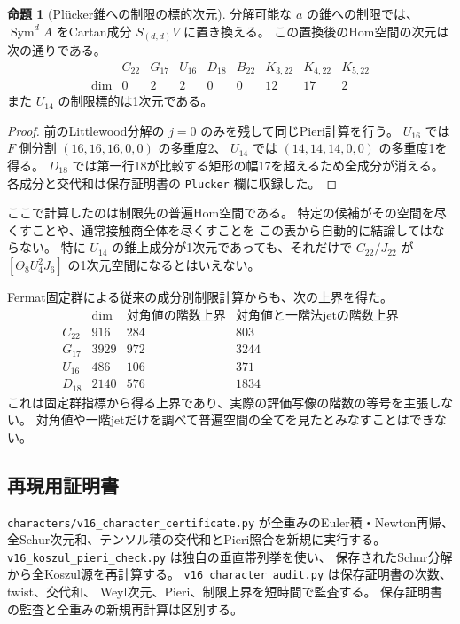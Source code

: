 \documentclass[a4paper,11pt]{ltjsarticle}
\theoremstyle{definition}
\newtheorem{proposition}[theorem]{命題}
\begin{document}
\begin{proposition}[Pl\"ucker錐への制限の標的次元]
\label{prop:v16-plucker-dimensions}
分解可能な $a$ の錐への制限では、$\operatorname{Sym}^dA$ をCartan成分
$S_{(d,d)}V$ に置き換える。
この置換後のHom空間の次元は次の通りである。
\[
\begin{array}{c|rrrrrrrr}
 &C_{22}&G_{17}&U_{16}&D_{18}&B_{22}&K_{3,22}&K_{4,22}&K_{5,22}\\\hline
 \dim&0&2&2&0&0&12&17&2
\end{array}
\]
また $U_{14}$ の制限標的は1次元である。
\end{proposition}

\begin{proof}
前のLittlewood分解の $j=0$ のみを残して同じPieri計算を行う。
$U_{16}$ では $F$ 側分割 $(16,16,16,0,0)$ の多重度2、
$U_{14}$ では $(14,14,14,0,0)$ の多重度1を得る。
$D_{18}$ では第一行18が比較する矩形の幅17を超えるため全成分が消える。
各成分と交代和は保存証明書の \texttt{Plucker} 欄に収録した。
\end{proof}

ここで計算したのは制限先の普遍Hom空間である。
特定の候補がその空間を尽くすことや、通常接触商全体を尽くすことを
この表から自動的に結論してはならない。
特に $U_{14}$ の錐上成分が1次元であっても、それだけで
$C_{22}/J_{22}$ が $[\Theta_8U_4^2J_6]$ の1次元空間になるとはいえない。

Fermat固定群による従来の成分別制限計算からも、次の上界を得た。
\[
\begin{array}{c|r|r|r}
 &\dim&\text{対角値の階数上界}&\text{対角値と一階法jetの階数上界}\\\hline
C_{22}&916&284&803\\
G_{17}&3929&972&3244\\
U_{16}&486&106&371\\
D_{18}&2140&576&1834
\end{array}
\]
これは固定群指標から得る上界であり、実際の評価写像の階数の等号を主張しない。
対角値や一階jetだけを調べて普遍空間の全てを見たとみなすことはできない。

\subsection{再現用証明書}

\texttt{characters/v16\_character\_certificate.py} が全重みのEuler積・Newton再帰、
全Schur次元和、テンソル積の交代和とPieri照合を新規に実行する。
\texttt{v16\_koszul\_pieri\_check.py} は独自の垂直帯列挙を使い、
保存されたSchur分解から全Koszul源を再計算する。
\texttt{v16\_character\_audit.py} は保存証明書の次数、twist、交代和、
Weyl次元、Pieri、制限上界を短時間で監査する。
保存証明書の監査と全重みの新規再計算は区別する。
\end{document}
